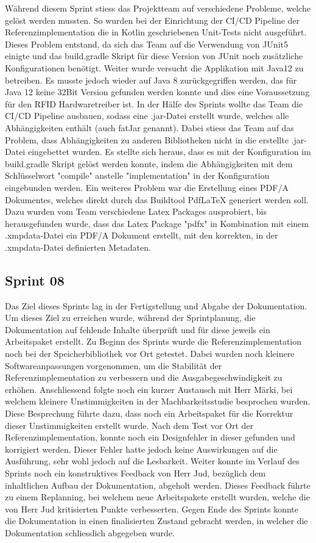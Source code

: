  Während diesem Sprint stiess das Projektteam auf verschiedene Probleme, welche gelöst werden mussten. So wurden bei der Einrichtung der CI/CD Pipeline der Referenzimplementation die in Kotlin geschriebenen Unit-Tests nicht ausgeführt. Dieses Problem entstand, da sich das Team auf die Verwendung von JUnit5 einigte und das build.gradle Skript für diese Version von JUnit noch zusätzliche Konfigurationen benötigt. Weiter wurde versucht die Applikation mit Java12 zu betreiben. Es musste jedoch wieder auf Java 8 zurückgegriffen werden, das für Java 12 keine 32Bit Version gefunden werden konnte und dies eine Voraussetzung für den RFID Hardwaretreiber ist. In der Hälfe des Sprints wollte das Team die CI/CD Pipeline ausbauen, sodass eine .jar-Datei erstellt wurde, welches alle Abhängigkeiten enthält (auch fatJar genannt). Dabei stiess das Team auf das Problem, dass Abhängigkeiten zu anderen Bibliotheken nicht in die erstellte .jar-Datei eingebettet wurden. Es stellte sich heraus, dass es mit der Konfiguration im build.gradle Skript gelöst werden konnte, indem die Abhängigkeiten mit dem Schlüsselwort "compile" anstelle "implementation" in der Konfiguration eingebunden werden. Ein weiteres Problem war die Erstellung eines PDF/A Dokumentes, welches direkt durch das Buildtool PdfLaTeX generiert werden soll. Dazu wurden vom Team verschiedene Latex Packages ausprobiert, bis herausgefunden wurde, dass das Latex Package "pdfx" in Kombination mit einem .xmpdata-Datei ein PDF/A Dokument erstellt, mit den korrekten, in der .xmpdata-Datei definierten Metadaten.

\subsection{Sprint 08}
Das Ziel dieses Sprints lag in der Fertigstellung und Abgabe der Dokumentation.
Um dieses Ziel zu erreichen wurde, während der Sprintplanung, die Dokumentation auf fehlende Inhalte überprüft und für diese jeweils ein Arbeitspaket erstellt. Zu Beginn des Sprints wurde die Referenzimplementation noch bei der Speicherbibliothek vor Ort getestet. Dabei wurden noch kleinere Softwareanpassungen vorgenommen, um die Stabilität der Referenzimplementation zu verbessern und die Ausgabegeschwindigkeit zu erhöhen. Anschliessend folgte noch ein kurzer Austausch mit Herr Märki, bei welchem kleinere Unstimmigkeiten in der Machbarkeitsstudie besprochen wurden. Diese Besprechung führte dazu, dass noch ein Arbeitspaket für die Korrektur dieser Unstimmigkeiten erstellt wurde. Nach dem Test vor Ort der Referenzimplementation, konnte noch ein Designfehler in dieser gefunden und korrigiert werden. Dieser Fehler hatte jedoch keine Auswirkungen auf die Ausführung, sehr wohl jedoch auf die Lesbarkeit. 
Weiter konnte im Verlauf des Sprints noch ein konstruktives Feedback von Herr Jud, bezüglich dem inhaltlichen Aufbau der Dokumentation, abgeholt werden. Dieses Feedback führte zu einem Replanning, bei welchem neue Arbeitspakete erstellt wurden, welche die von Herr Jud kritisierten Punkte verbesserten. Gegen Ende des Sprints konnte die Dokumentation in einen finalisierten Zustand gebracht werden, in welcher die Dokumentation schliesslich abgegeben wurde.


